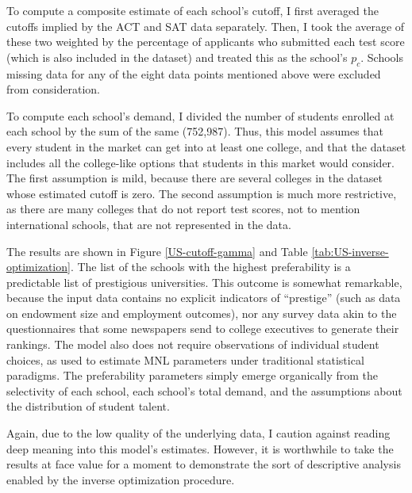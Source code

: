 \documentclass[12pt]{article}
\theoremstyle{definition}
\begin{document}
To compute a composite estimate of each school's cutoff, I first averaged the cutoffs implied by the ACT and SAT data separately. Then, I took the average of these two weighted by the percentage of applicants who submitted each test score (which is also included in the dataset) and treated this as the school's $p_c$. Schools missing data for any of the eight data points mentioned above were excluded from consideration.

To compute each school's demand, I divided the number of students enrolled at each school by the sum of the same (752,987). Thus, this model assumes that every student in the market can get into at least one college, and that the dataset includes all the college-like options that students in this market would consider. The first assumption is mild, because there are several colleges in the dataset whose estimated cutoff is zero. The second assumption is much more restrictive, as there are many colleges that do not report test scores, not to mention international schools, that are not represented in the data.

The results are shown in Figure \ref{US-cutoff-gamma} and Table \ref{tab:US-inverse-optimization}. The list of the schools with the highest preferability is a predictable list of prestigious universities. This outcome is somewhat remarkable, because the input data contains no explicit indicators of ``prestige'' (such as data on endowment size and employment outcomes), nor any survey data akin to the questionnaires that some newspapers send to college executives to generate their rankings. The model also does not require observations of individual student choices, as used to estimate MNL parameters under traditional statistical paradigms. The preferability parameters simply emerge organically from the selectivity of each school, each school's total demand, and the assumptions about the distribution of student talent.

Again, due to the low quality of the underlying data, I caution against reading deep meaning into this model's estimates. However, it is worthwhile to take the results at face value for a moment to demonstrate the sort of descriptive analysis enabled by the inverse optimization procedure.
\end{document}
